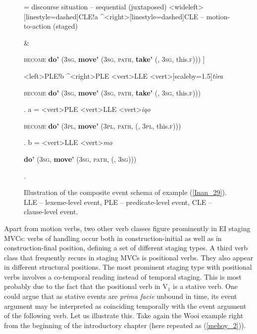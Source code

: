 \begin{sidewaysfigure}


\jtree[xunit=9.5em,yunit=2em]
\! = {discourse situation -- sequential (juxtaposed)}
<wideleft>[linestyle=dashed]{CLE}!a ^<right>[linestyle=dashed]{CLE -- motion-to-action (staged)}{\begin{scriptsize} [ \textbf{do'} (3\textsc{sg}, \textbf{move'} (3\textsc{sg}, \textsc{path}, \textbf{\rnode{D1}{come'}} (\rnode{B1}{e$_2$}, 3\textsc{sg})))\end{scriptsize} \&}
{\begin{scriptsize} \textsc{become} \textbf{do'} (3\textsc{sg}, \textbf{move'} (3\textsc{sg}, \textsc{path}, \textbf{take'} (, 3\textsc{sg}, this.\textsc{f}))) ]\end{scriptsize}}
<left>{PLE}!b ^<right>{PLE}
<vert>{LLE}
<vert>[scaleby=1.5]{\textit{tira}}{\begin{scriptsize} \textsc{become} \textbf{do'} (3\textsc{sg}, \textbf{move'} (3\textsc{sg}, \textsc{path}, \textbf{take'} (, 3\textsc{sg}, this.\textsc{f})))\end{scriptsize}}.
\!a = <vert>{PLE}
<vert>{LLE}
<vert>{\textit{iqo}}
{\begin{scriptsize} \textsc{become} \textbf{do'} (3\textsc{pl}, \textbf{move'} (3\textsc{pl}, \textsc{path}, \textbf{} (, 3\textsc{pl}, this.\textsc{f})))\end{scriptsize}}.
\!b = <vert>{LLE}
<vert>{\textit{mo}}
{\begin{scriptsize} \textbf{do'} (3\textsc{sg}, \textbf{move'} (3\textsc{sg}, \textsc{path}, \textbf{} (, 3\textsc{sg})))\end{scriptsize}}.
\endjtree


\caption[Event schema illustration of example (\ref{Inan_29})]{Illustration of the composite event schema of example (\ref{Inan_29}). LLE -- lexeme-level event, PLE -- predicate-level event, CLE -- clause-level event.}
\label{figure:eventschema_Inan29}
\end{sidewaysfigure}


Apart from motion verbs, two other verb classes figure prominently in EI staging MVCs: verbs of handling occur both in construction-initial as well as in construction-final position, defining a set of different staging types. A third verb class that frequently recurs in staging MVCs is positional verbs. They also appear in different structural positions. The most prominent staging type with positional verbs involves a co-temporal reading instead of temporal staging. This is most probably due to the fact that the positional verb in V$_1$ is a stative verb. One could argue that as stative events are \textit{prima facie} unbound in time, its event argument may be interpreted as coinciding temporally with the event argument of the following verb. Let us illustrate this. Take again the Wooi example right from the beginning of the introductory chapter (here repeated as (\ref{mehoy_2})).

